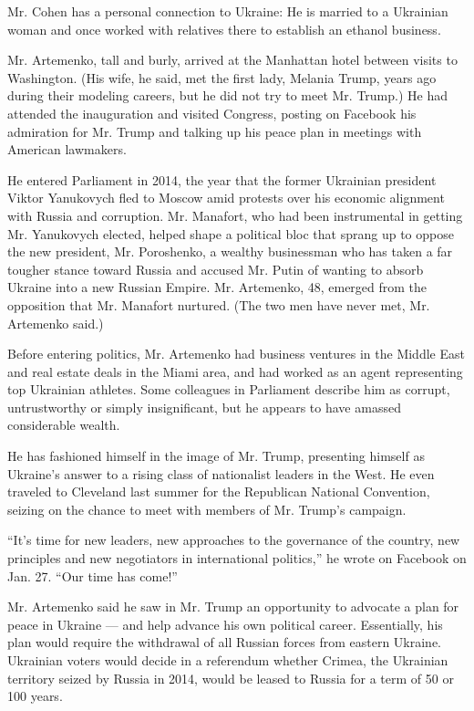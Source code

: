 Mr. Cohen has a personal connection to Ukraine: He is married to a
Ukrainian woman and once worked with relatives there to establish an
ethanol business.

Mr. Artemenko, tall and burly, arrived at the Manhattan hotel between
visits to Washington. (His wife, he said, met the first lady, Melania
Trump, years ago during their modeling careers, but he did not try to
meet Mr. Trump.) He had attended the inauguration and visited Congress,
posting on Facebook his admiration for Mr. Trump and talking up his
peace plan in meetings with American lawmakers.

He entered Parliament in 2014, the year that the former Ukrainian
president Viktor Yanukovych fled to Moscow amid protests over his
economic alignment with Russia and corruption. Mr. Manafort, who had
been instrumental in getting Mr. Yanukovych elected, helped shape a
political bloc that sprang up to oppose the new president, Mr.
Poroshenko, a wealthy businessman who has taken a far tougher stance
toward Russia and accused Mr. Putin of wanting to absorb Ukraine into a
new Russian Empire. Mr. Artemenko, 48, emerged from the opposition that
Mr. Manafort nurtured. (The two men have never met, Mr. Artemenko said.)

Before entering politics, Mr. Artemenko had business ventures in the
Middle East and real estate deals in the Miami area, and had worked as
an agent representing top Ukrainian athletes. Some colleagues in
Parliament describe him as corrupt, untrustworthy or simply
insignificant, but he appears to have amassed considerable wealth.

He has fashioned himself in the image of Mr. Trump, presenting himself
as Ukraine's answer to a rising class of nationalist leaders in the
West. He even traveled to Cleveland last summer for the Republican
National Convention, seizing on the chance to meet with members of Mr.
Trump's campaign.

``It's time for new leaders, new approaches to the governance of the
country, new principles and new negotiators in international politics,''
he wrote on Facebook on Jan. 27. ``Our time has come!''

Mr. Artemenko said he saw in Mr. Trump an opportunity to advocate a plan
for peace in Ukraine --- and help advance his own political career.
Essentially, his plan would require the withdrawal of all Russian forces
from eastern Ukraine. Ukrainian voters would decide in a referendum
whether Crimea, the Ukrainian territory seized by Russia in 2014, would
be leased to Russia for a term of 50 or 100 years.

